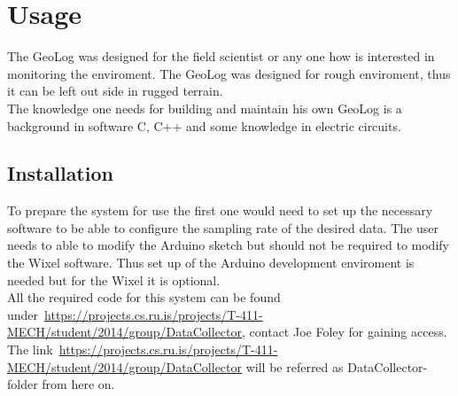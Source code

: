 \section{Usage}
The GeoLog was designed for the field scientist or any one how is interested in monitoring the enviroment. The GeoLog was designed for rough enviroment, thus it can be left out side in rugged terrain.\\
The knowledge one needs for building and maintain his own GeoLog is a background in software C, C++ and some knowledge in electric circuits. %

\subsection{Installation}
To prepare the system for use the first one would need to set up the necessary software to be able to configure the sampling rate of the desired data. The user needs to able to modify the Arduino sketch but should not be required to modify the Wixel software. Thus set up of the Arduino development enviroment is needed but for the Wixel it is optional.\\
All the required code for this system can be found under~\url{https://projects.cs.ru.is/projects/T-411-MECH/student/2014/group/DataCollector}, contact Joe Foley for gaining access. The link~\url{https://projects.cs.ru.is/projects/T-411-MECH/student/2014/group/DataCollector} will be referred as DataCollector-folder from here on.\\

